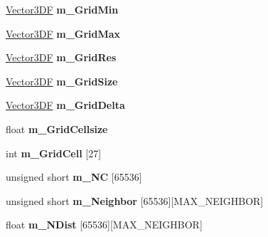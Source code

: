 \begin{DoxyCompactItemize}
\item 
\hypertarget{class_point_set_a94dac17de7bd50a947689256b4406285}{\hyperlink{class_vector3_d_f}{Vector3\+D\+F} {\bfseries m\+\_\+\+Grid\+Min}}\label{class_point_set_a94dac17de7bd50a947689256b4406285}

\item 
\hypertarget{class_point_set_a885f22b57e153ae8a6a596be715221b4}{\hyperlink{class_vector3_d_f}{Vector3\+D\+F} {\bfseries m\+\_\+\+Grid\+Max}}\label{class_point_set_a885f22b57e153ae8a6a596be715221b4}

\item 
\hypertarget{class_point_set_a56b11bed2afc8fb700ac363c8801cfb9}{\hyperlink{class_vector3_d_f}{Vector3\+D\+F} {\bfseries m\+\_\+\+Grid\+Res}}\label{class_point_set_a56b11bed2afc8fb700ac363c8801cfb9}

\item 
\hypertarget{class_point_set_a6db084a42409bafa727253d09816abd1}{\hyperlink{class_vector3_d_f}{Vector3\+D\+F} {\bfseries m\+\_\+\+Grid\+Size}}\label{class_point_set_a6db084a42409bafa727253d09816abd1}

\item 
\hypertarget{class_point_set_ae5a7707ca1df19617213ef08c6d20f8e}{\hyperlink{class_vector3_d_f}{Vector3\+D\+F} {\bfseries m\+\_\+\+Grid\+Delta}}\label{class_point_set_ae5a7707ca1df19617213ef08c6d20f8e}

\item 
\hypertarget{class_point_set_a0c6d3e08b8804bce99a19d5e154849bc}{float {\bfseries m\+\_\+\+Grid\+Cellsize}}\label{class_point_set_a0c6d3e08b8804bce99a19d5e154849bc}

\item 
\hypertarget{class_point_set_aad7eadf411ceb5f6c9fd925ecdd0f2d8}{int {\bfseries m\+\_\+\+Grid\+Cell} \mbox{[}27\mbox{]}}\label{class_point_set_aad7eadf411ceb5f6c9fd925ecdd0f2d8}

\item 
\hypertarget{class_point_set_a57e1f5fc7266eca94a2b9bae75e10e63}{unsigned short {\bfseries m\+\_\+\+N\+C} \mbox{[}65536\mbox{]}}\label{class_point_set_a57e1f5fc7266eca94a2b9bae75e10e63}

\item 
\hypertarget{class_point_set_ab4aa7538b9625e9b4909bb04bcc937ef}{unsigned short {\bfseries m\+\_\+\+Neighbor} \mbox{[}65536\mbox{]}\mbox{[}M\+A\+X\+\_\+\+N\+E\+I\+G\+H\+B\+O\+R\mbox{]}}\label{class_point_set_ab4aa7538b9625e9b4909bb04bcc937ef}

\item 
\hypertarget{class_point_set_a031a9df6be416c6fce4c826a25011809}{float {\bfseries m\+\_\+\+N\+Dist} \mbox{[}65536\mbox{]}\mbox{[}M\+A\+X\+\_\+\+N\+E\+I\+G\+H\+B\+O\+R\mbox{]}}\label{class_point_set_a031a9df6be416c6fce4c826a25011809}

\end{DoxyCompactItemize}
